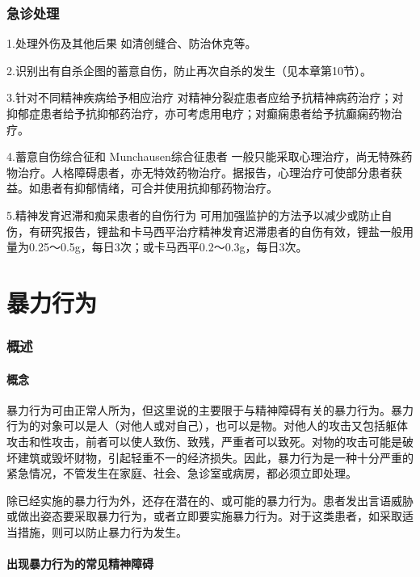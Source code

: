 \subsubsection{急诊处理}

1.处理外伤及其他后果 如清创缝合、防治休克等。

2.识别出有自杀企图的蓄意自伤，防止再次自杀的发生（见本章第10节）。

3.针对不同精神疾病给予相应治疗
对精神分裂症患者应给予抗精神病药治疗；对抑郁症患者给予抗抑郁药治疗，亦可考虑用电疗；对癫痫患者给予抗癫痫药物治疗。

4.蓄意自伤综合征和 Munchausen综合征患者
一般只能采取心理治疗，尚无特殊药物治疗。人格障碍患者，亦无特效药物治疗。据报告，心理治疗可使部分患者获益。如患者有抑郁情绪，可合并使用抗抑郁药物治疗。

5.精神发育迟滞和痴呆患者的自伤行为
可用加强监护的方法予以减少或防止自伤，有研究报告，锂盐和卡马西平治疗精神发育迟滞患者的自伤有效，锂盐一般用量为0.25～0.5g，每日3次；或卡马西平0.2～0.3g，每日3次。

\protect\hypertarget{text00054.html}{}{}

\section{暴力行为}

\subsubsection{概述}

\paragraph{概念}

暴力行为可由正常人所为，但这里说的主要限于与精神障碍有关的暴力行为。暴力行为的对象可以是人（对他人或对自己），也可以是物。对他人的攻击又包括躯体攻击和性攻击，前者可以使人致伤、致残，严重者可以致死。对物的攻击可能是破坏建筑或毁坏财物，引起轻重不一的经济损失。因此，暴力行为是一种十分严重的紧急情况，不管发生在家庭、社会、急诊室或病房，都必须立即处理。

除已经实施的暴力行为外，还存在潜在的、或可能的暴力行为。患者发出言语威胁或做出姿态要采取暴力行为，或者立即要实施暴力行为。对于这类患者，如采取适当措施，则可以防止暴力行为发生。

\paragraph{出现暴力行为的常见精神障碍}

